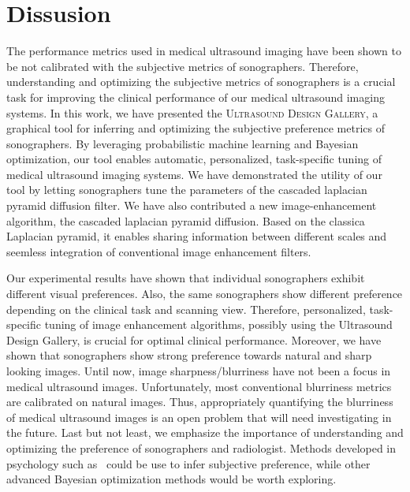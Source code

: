 
\section{Dissusion}\label{section:conclusion}
The performance metrics used in medical ultrasound imaging have been shown to be not calibrated with the subjective metrics of sonographers.
Therefore, understanding and optimizing the subjective metrics of sonographers is a crucial task for improving the clinical performance of our medical ultrasound imaging systems.
In this work, we have presented the \textsc{Ultrasound Design Gallery}, a graphical tool for inferring and optimizing the subjective preference metrics of sonographers.
By leveraging probabilistic machine learning and Bayesian optimization, our tool enables automatic, personalized, task-specific tuning of medical ultrasound imaging systems.
We have demonstrated the utility of our tool by letting sonographers tune the parameters of the cascaded laplacian pyramid diffusion filter.
We have also contributed a new image-enhancement algorithm, the cascaded laplacian pyramid diffusion.
Based on the classica Laplacian pyramid, it enables sharing information between different scales and seemless integration of conventional image enhancement filters.

Our experimental results have shown that individual sonographers exhibit different visual preferences.
Also, the same sonographers show different preference depending on the clinical task and scanning view.
Therefore, personalized, task-specific tuning of image enhancement algorithms, possibly using the Ultrasound Design Gallery, is crucial for optimal clinical performance.
Moreover, we have shown that sonographers show strong preference towards natural and sharp looking images.
Until now, image sharpness/blurriness have not been a focus in medical ultrasound images.
Unfortunately, most conventional blurriness metrics are calibrated on natural images.
Thus, appropriately quantifying the blurriness of medical ultrasound images is an open problem that will need investigating in the future.
Last but not least, we emphasize the importance of understanding and optimizing the preference of sonographers and radiologist.
Methods developed in psychology such as~\cite{NIPS2007_89d4402d} could be use to infer subjective preference, while other advanced Bayesian optimization methods would be worth exploring.

